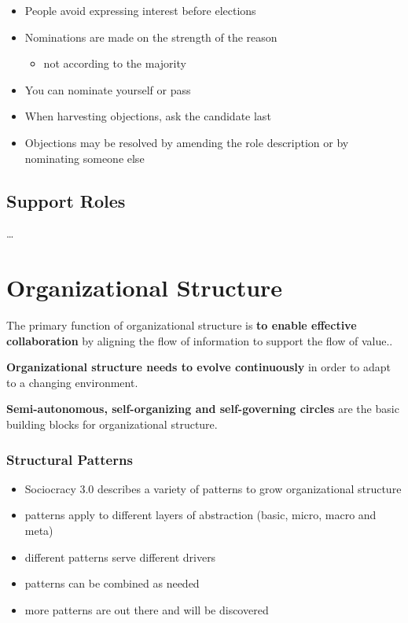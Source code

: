 \begin{itemize}
\item People avoid expressing interest before elections

\item Nominations are made on the strength of the reason

\begin{itemize}
\item not according to the majority

\end{itemize}

\item You can nominate yourself or pass

\item When harvesting objections, ask the candidate last

\item Objections may be resolved by amending the role description or by nominating someone else

\end{itemize}

\section{Support Roles}
\label{supportroles}

{\ldots}

\chapter{Organizational Structure}
\label{organizationalstructure}

The primary function of organizational structure is \textbf{to enable effective collaboration} by aligning the flow of information to support the flow of value..

\textbf{Organizational structure needs to evolve continuously} in order to adapt to a changing environment.

\textbf{Semi-autonomous, self-organizing and self-governing circles} are the basic building blocks for organizational structure.

\subsection{Structural Patterns}
\label{structuralpatterns}

\begin{itemize}
\item Sociocracy 3.0 describes a variety of patterns to grow organizational structure

\item patterns apply to different layers of abstraction (basic, micro, macro and meta)

\item different patterns serve different drivers

\item patterns can be combined as needed

\item more patterns are out there and will be discovered

\end{itemize}

